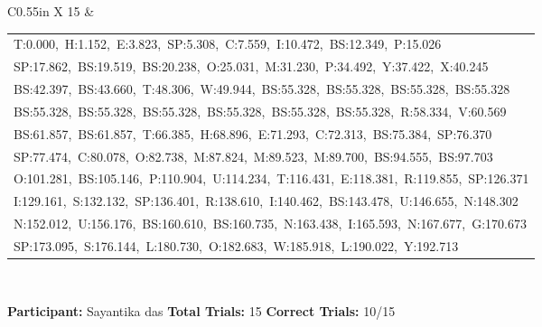 \documentclass[10pt,a4paper]{article}
\begin{document}
\begin{center}
\begin{tabularx}{\textwidth}{
    C{0.55in}
    X
}
15 &
\begin{tabular}[t]{@{}l@{}}
T:0.000,\ H:1.152,\ E:3.823,\ SP:5.308,\ C:7.559,\ I:10.472,\ BS:12.349,\ P:15.026\\
SP:17.862,\ BS:19.519,\ BS:20.238,\ O:25.031,\ M:31.230,\ P:34.492,\ Y:37.422,\ X:40.245\\
BS:42.397,\ BS:43.660,\ T:48.306,\ W:49.944,\ BS:55.328,\ BS:55.328,\ BS:55.328,\ BS:55.328\\
BS:55.328,\ BS:55.328,\ BS:55.328,\ BS:55.328,\ BS:55.328,\ BS:55.328,\ R:58.334,\ V:60.569\\
BS:61.857,\ BS:61.857,\ T:66.385,\ H:68.896,\ E:71.293,\ C:72.313,\ BS:75.384,\ SP:76.370\\
SP:77.474,\ C:80.078,\ O:82.738,\ M:87.824,\ M:89.523,\ M:89.700,\ BS:94.555,\ BS:97.703\\
O:101.281,\ BS:105.146,\ P:110.904,\ U:114.234,\ T:116.431,\ E:118.381,\ R:119.855,\ SP:126.371\\
I:129.161,\ S:132.132,\ SP:136.401,\ R:138.610,\ I:140.462,\ BS:143.478,\ U:146.655,\ N:148.302\\
N:152.012,\ U:156.176,\ BS:160.610,\ BS:160.735,\ N:163.438,\ I:165.593,\ N:167.677,\ G:170.673\\
SP:173.095,\ S:176.144,\ L:180.730,\ O:182.683,\ W:185.918,\ L:190.022,\ Y:192.713
\end{tabular}
\\[0.12cm]

\bottomrule
\end{tabularx}
\end{center}

\vfill


\noindent
\textbf{Participant:} Sayantika das
\hfill
\textbf{Total Trials:} 15
\hfill
\textbf{Correct Trials:} 10/15
\end{document}
